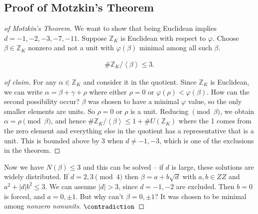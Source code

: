 \hypertarget{proof-of-motzkins-theorem}{%
\subsection{Proof of Motzkin's
Theorem}\label{proof-of-motzkins-theorem}}

\begin{proof}[of Motzkin's Theorem]

We want to show that being Euclidean implies \(d=-1,-2,-3,-7,-11\).
Suppose \({\mathbb{Z}}_K\) is Euclidean with respect to \(\varphi\).
Choose \(\beta\in {\mathbb{Z}}_K\) nonzero and not a unit with
\(\varphi(\beta)\) minimal among all such \(\beta\).

\begin{claim}

\begin{align*}
\# {\mathbb{Z}}_K / \left\langle{ \beta }\right\rangle \leq 3 
.\end{align*}

\end{claim}

\begin{proof}[of claim]

For any \(\alpha\in {\mathbb{Z}}_K\) and consider it in the quotient.
Since \({\mathbb{Z}}_K\) is Euclidean, we can write
\(\alpha = \beta + \gamma+ \rho\) where either \(\rho=0\) or
\(\varphi(\rho ) < \varphi (\beta )\). How can the second possibility
occur? \(\beta\) was chosen to have a minimal \(\varphi\) value, so the
only smaller elements are units. So \(\rho = 0\) or \(\rho\) is a unit.
Reducing \(\pmod\beta\), we obtain \(\alpha= \rho \pmod\beta\), and
hence
\(\# {\mathbb{Z}}_K / \left\langle{ \beta }\right\rangle \leq 1 + \# U({\mathbb{Z}}_K)\)
where the 1 comes from the zero element and everything else in the
quotient has a representative that is a unit. This is bounded above by
\(3\) when \(d\neq -1, -3\), which is one of the exclusions in the
theorem.

\end{proof}

Now we have \(N( \beta) \leq 3\) and this can be solved -- if \(d\) is
large, these solutions are widely distributed. If \(d = 2, 3 \pmod 4\)
then \(\beta= a + b \sqrt{d}\) with \(a, b \in ZZ\) and
\(a^2 + {\left\lvert {d} \right\rvert}b^2 \leq 3\). We can assume
\({\left\lvert {d} \right\rvert}> 3\), since \(d=-1, -2\) are excluded.
Then \(b=0\) is forced, and \(a = 0, \pm 1\). But why can't
\(\beta=0, \pm 1\)? It was chosen to be minimal among \emph{nonzero
nonunits}. \(\contradiction\)


\end{proof}
